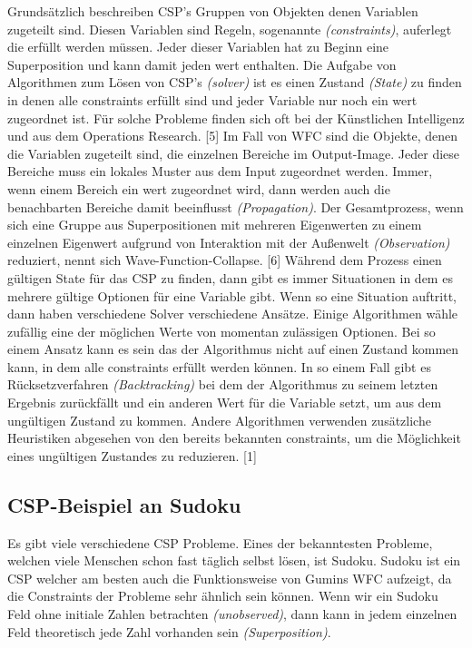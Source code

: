 \documentclass[12pt, a4paper,twoside,openright]{report}
\begin{document}
Grundsätzlich beschreiben CSP's Gruppen von Objekten denen Variablen zugeteilt sind.
Diesen Variablen sind Regeln, sogenannte \textit{(constraints)}, auferlegt die erfüllt werden müssen.
Jeder dieser Variablen hat zu Beginn eine Superposition und kann damit jeden wert enthalten.
Die Aufgabe von Algorithmen zum Lösen von CSP's \textit{(solver)} ist es einen Zustand \textit{(State)} zu finden in denen alle constraints erfüllt sind und jeder Variable nur noch ein wert zugeordnet ist.
Für solche Probleme finden sich oft bei der Künstlichen Intelligenz und aus dem Operations Research. {[5]}
Im Fall von WFC sind die Objekte, denen die Variablen zugeteilt sind, die einzelnen Bereiche im Output-Image.
Jeder diese Bereiche muss ein lokales Muster aus dem Input zugeordnet werden.
Immer, wenn einem Bereich ein wert zugeordnet wird, dann werden auch die benachbarten Bereiche damit beeinflusst \textit{(Propagation)}.
Der Gesamtprozess, wenn sich eine Gruppe aus Superpositionen mit mehreren Eigenwerten zu einem einzelnen Eigenwert aufgrund von Interaktion mit der Außenwelt \textit{(Observation)} reduziert,
nennt sich Wave-Function-Collapse. {[6]}
Während dem Prozess einen gültigen State für das CSP zu finden, dann gibt es immer Situationen in dem es mehrere gültige Optionen für eine Variable gibt.
Wenn so eine Situation auftritt, dann haben verschiedene Solver verschiedene Ansätze.
Einige Algorithmen wähle zufällig eine der möglichen Werte von momentan zulässigen Optionen.
Bei so einem Ansatz kann es sein das der Algorithmus nicht auf einen Zustand kommen kann, in dem alle constraints erfüllt werden können.
In so einem Fall gibt es Rücksetzverfahren \textit{(Backtracking)} bei dem der Algorithmus zu seinem letzten Ergebnis zurückfällt und ein anderen Wert für die Variable setzt, um aus dem
ungültigen Zustand zu kommen.
Andere Algorithmen verwenden zusätzliche Heuristiken abgesehen von den bereits bekannten constraints, um die Möglichkeit eines ungültigen Zustandes zu reduzieren. {[1]}

\subsection{CSP-Beispiel an Sudoku}

Es gibt viele verschiedene CSP Probleme.
Eines der bekanntesten Probleme, welchen viele Menschen schon fast täglich selbst lösen, ist Sudoku.
Sudoku ist ein CSP welcher am besten auch die Funktionsweise von Gumins WFC aufzeigt, da die Constraints der Probleme sehr ähnlich sein können.
\newline
Wenn wir ein Sudoku Feld ohne initiale Zahlen betrachten \textit{(unobserved)}, dann kann in jedem einzelnen Feld theoretisch jede Zahl vorhanden sein \textit{(Superposition)}.
\end{document}
